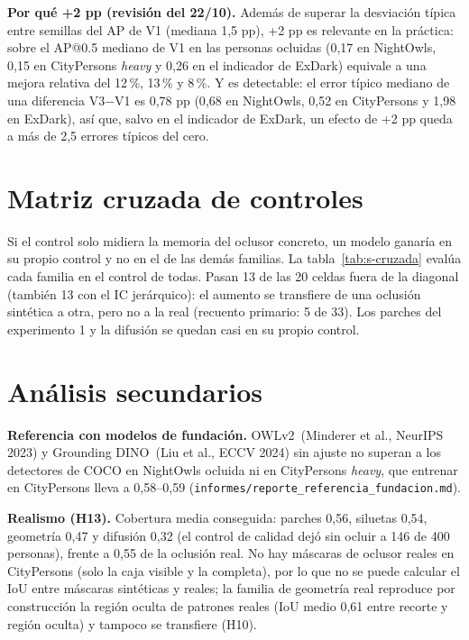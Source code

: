 \documentclass[10pt]{article}
\begin{document}


\noindent\textbf{Por qué +2 pp (revisión del 22/10).} Además de superar la desviación típica entre semillas del AP de V1 (mediana 1,5 pp), +2 pp es relevante en la práctica: sobre el AP@0.5 mediano de V1 en las personas ocluidas (0,17 en NightOwls, 0,15 en CityPersons \emph{heavy} y 0,26 en el indicador de ExDark) equivale a una mejora relativa del 12\,\%, 13\,\% y 8\,\%. Y es detectable: el error típico mediano de una diferencia V3$-$V1 es 0,78 pp (0,68 en NightOwls, 0,52 en CityPersons y 1,98 en ExDark), así que, salvo en el indicador de ExDark, un efecto de +2 pp queda a más de 2,5 errores típicos del cero.

\section{Matriz cruzada de controles}
Si el control solo midiera la memoria del oclusor concreto, un modelo ganaría en su propio control y no en el de las demás familias. La tabla~\ref{tab:s-cruzada} evalúa cada familia en el control de todas. Pasan 13 de las 20 celdas fuera de la diagonal (también 13 con el IC jerárquico): el aumento se transfiere de una oclusión sintética a otra, pero no a la real (recuento primario: 5 de 33). Los parches del experimento 1 y la difusión se quedan casi en su propio control.



\section{Análisis secundarios}




\noindent\textbf{Referencia con modelos de fundación.} OWLv2~(Minderer et al., NeurIPS 2023) y Grounding DINO~(Liu et al., ECCV 2024) sin ajuste no superan a los detectores de COCO en NightOwls ocluida ni en CityPersons \emph{heavy}, que entrenar en CityPersons lleva a 0,58--0,59 (\texttt{informes/reporte\_referencia\_fundacion.md}).

\noindent\textbf{Realismo (H13).} Cobertura media conseguida: parches 0,56, siluetas 0,54, geometría 0,47 y difusión 0,32 (el control de calidad dejó sin ocluir a 146 de 400 personas), frente a 0,55 de la oclusión real. No hay máscaras de oclusor reales en CityPersons (solo la caja visible y la completa), por lo que no se puede calcular el IoU entre máscaras sintéticas y reales; la familia de geometría real reproduce por construcción la región oculta de patrones reales (IoU medio 0,61 entre recorte y región oculta) y tampoco se transfiere (H10).
\end{document}
